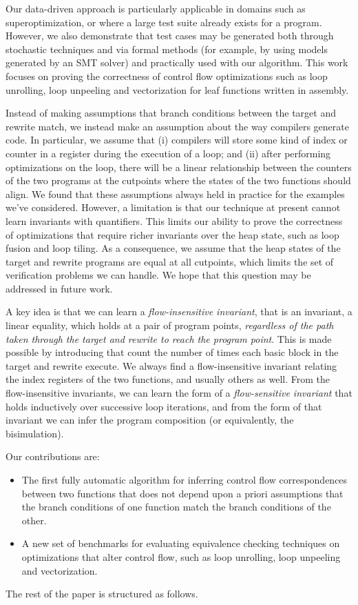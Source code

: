 Our data-driven approach is particularly applicable in domains such as
superoptimization, or where a large test suite already exists for a
program. However, we also demonstrate that test cases may be generated
both through stochastic techniques and via formal methods (for
example, by using models generated by an SMT solver) and practically
used with our algorithm. This work focuses on proving the correctness
of control flow optimizations such as loop unrolling, loop unpeeling
and vectorization for leaf functions written in \arch{} assembly.

Instead of making assumptions that branch conditions between the
target and rewrite match, we instead make an assumption about the way
compilers generate code. In particular, we assume that (i) compilers
will store some kind of index or counter in a register during the
execution of a loop; and (ii) after performing optimizations on the
loop, there will be a linear relationship between the counters of the
two programs at the cutpoints where the states of the two functions
should align. We found that these assumptions always held in practice
for the examples we've considered. However, a limitation is that our
technique at present cannot learn invariants with quantifiers. This
limits our ability to prove the correctness of optimizations that
require richer invariants over the heap state, such as loop fusion
and loop tiling. As a consequence, we assume that the heap states
 of the target and rewrite programs are equal at
all cutpoints, which limits the set of verification problems we can
handle. We hope that this question may be addressed in future work.

A key idea is that we can learn a \emph{flow-insensitive invariant},
that is an invariant, a linear equality, which holds at a pair of
program points, \emph{regardless of the path taken through the target
and rewrite to reach the program point}. This is made possible by
introducing \shadow{} that count the number of times each basic block
in the target and rewrite execute. We always find a flow-insensitive
invariant relating the index registers of the two functions, and
usually others as well. From the flow-insensitive invariants, we
can learn the form of a \emph{flow-sensitive invariant} that holds
inductively over successive loop iterations, and from the form of that
invariant we can infer the program composition (or equivalently, the
bisimulation).

Our contributions are:

\begin{itemize}
\item The first fully automatic algorithm for inferring control flow
correspondences between two functions that does not depend upon a
priori assumptions that the branch conditions of one function match
the branch conditions of the other.
\item A new set of benchmarks for evaluating equivalence checking
techniques on optimizations that alter control flow, such as loop
unrolling, loop unpeeling and vectorization.
\end{itemize}

The rest of the paper is structured as follows.
